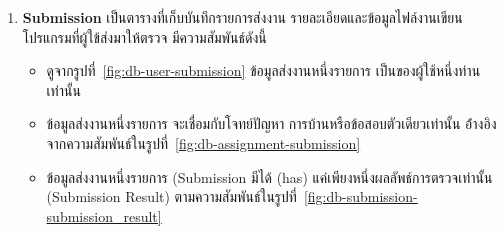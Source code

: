 \documentclass[12pt,oneside,openright,a4paper]{cpe-thai-project}
\begin{document}
\begin{enumerate}
\begin{itemize}
\begin{figure}[H]
                    \end{figure}
                    \item โจทย์ปัญหา การบ้านหรือข้อสอบแต่ละข้อมี (contains) ได้หลายกรณีทดสอบหรือเทสเคส (Test Case) ตามในรูปที่~\ref{fig:db-assignment-testcase}
                    \begin{figure}[H]
                        \centering 
                        \caption[แผนผังแสดงความสัมพันธ์ระหว่างตาราง Assignment และ TestCase]{แผนผังแสดงความสัมพันธ์ระหว่างตาราง Assignment และ TestCase}
                        \label{fig:db-assignment-testcase}
                    \end{figure}
                \end{itemize}
        \item \textbf{Submission}
            เป็นตารางที่เก็บบันทึกรายการส่งงาน รายละเอียดและข้อมูลไฟล์งานเขียนโปรแกรมที่ผู้ใข้ส่งมาให้ตรวจ มีความสัมพันธ์ดังนี้
                \begin{itemize}
                    \item ดูจากรูปที่~\ref{fig:db-user-submission} ข้อมูลส่งงานหนึ่งรายการ เป็นของผู้ใช้หนึ่งท่านเท่านั้น
                    \item ข้อมูลส่งงานหนึ่งรายการ จะเชื่อมกับโจทย์ปัญหา การบ้านหรือข้อสอบตัวเดียวเท่านั้น อ้่างอิงจากความสัมพันธ์ในรูปที่~\ref{fig:db-assignment-submission}
                    \item ข้อมูลส่งงานหนึ่งรายการ (Submission มีได้ (has) แค่เพียงหนึ่งผลลัพธ์การตรวจเท่านั้น (Submission Result) ตามความสัมพันธ์ในรูปที่~\ref{fig:db-submission-submission_result}
                    \begin{figure}[H]
                        \centering 
                        \begin{tikzpicture}[auto,node distance=1.5cm]

\end{tikzpicture}
\end{figure}
\end{itemize}
\end{enumerate}
\end{document}
